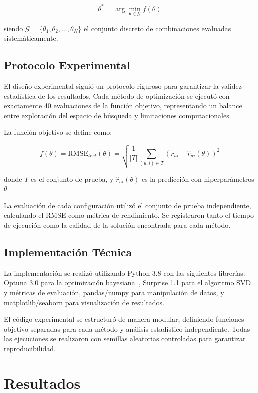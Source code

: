 \documentclass[conference]{IEEEtran}
\begin{document}
\begin{equation}
\theta^* = \arg\min_{\theta \in \mathcal{G}} f(\theta)
\end{equation}

siendo $\mathcal{G} = \{\theta_1, \theta_2, \dots, \theta_N\}$ el conjunto discreto de combinaciones evaluadas sistemáticamente.

\subsection{Protocolo Experimental}

El diseño experimental siguió un protocolo riguroso para garantizar la validez estadística de los resultados. Cada método de optimización se ejecutó con exactamente 40 evaluaciones de la función objetivo, representando un balance entre exploración del espacio de búsqueda y limitaciones computacionales.

La función objetivo se define como:

\begin{equation}
f(\theta) = \text{RMSE}_{test}(\theta) = \sqrt{\frac{1}{|T|} \sum_{(u,i) \in T} (r_{ui} - \hat{r}_{ui}(\theta))^2}
\end{equation}

donde $T$ es el conjunto de prueba, y $\hat{r}_{ui}(\theta)$ es la predicción con hiperparámetros $\theta$.

La evaluación de cada configuración utilizó el conjunto de prueba independiente, calculando el RMSE como métrica de rendimiento. Se registraron tanto el tiempo de ejecución como la calidad de la solución encontrada para cada método.

\subsection{Implementación Técnica}

La implementación se realizó utilizando Python 3.8 con las siguientes librerías: Optuna 3.0 para la optimización bayesiana~\cite{b8}, Surprise 1.1 para el algoritmo SVD y métricas de evaluación, pandas/numpy para manipulación de datos, y matplotlib/seaborn para visualización de resultados.

El código experimental se estructuró de manera modular, definiendo funciones objetivo separadas para cada método y análisis estadístico independiente. Todas las ejecuciones se realizaron con semillas aleatorias controladas para garantizar reproducibilidad.

\section{Resultados}
\end{document}
